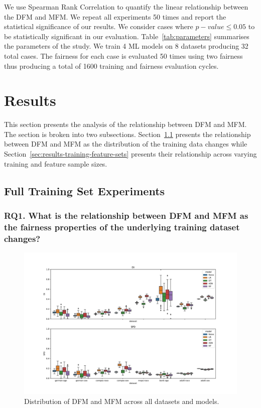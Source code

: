 \documentclass{article}
\begin{document}
We use Spearman Rank Correlation to quantify the linear relationship
between the DFM and MFM. We repeat all experiments 50 times and report
the statistical significance of our results. We consider cases where
$p-value\le0.05$ to be statistically significant in our
evaluation. Table \ref{tab:parameters} summarises the parameters of
the study. We train 4 ML models on 8 datasets producing 32 total
cases. The fairness for each case is evaluated 50 times using two
fairness thus producing a total of 1600 training and fairness
evaluation cycles.

\section{Results}\label{sec:results}

This section presents the analysis of the relationship between DFM and
MFM. The section is broken into two
subsections. Section \ref{sec:results-full} presents the relationship
between DFM and MFM as the distribution of the training data changes
while Section \ref{sec:results-training-feature-sets} presents their
relationship across varying training and feature sample sizes.

\subsection{Full Training Set Experiments}\label{sec:results-full}
\subsubsection{RQ1. What is the relationship between DFM and MFM as
the fairness properties of the underlying training dataset changes?}\label{sec:results-full-rel}

\begin{figure}
  \centering
  \includegraphics[width=0.95\linewidth]{boxplot--dataset--di-spd--exp-full.pdf}
  \caption{Distribution of DFM and MFM across all datasets and models.}
  \label{fig:boxplot--dataset--di-spd--exp-full}
\end{figure}
\end{document}
